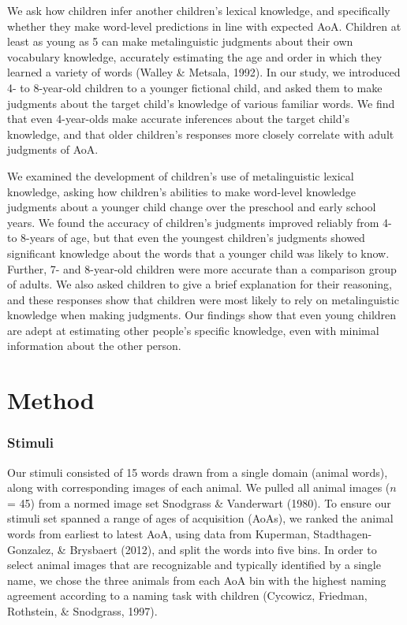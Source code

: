 \documentclass[10pt, letterpaper]{article}
\begin{document}
We ask how children infer another children's lexical knowledge, and
specifically whether they make word-level predictions in line with
expected AoA. Children at least as young as 5 can make metalinguistic
judgments about their own vocabulary knowledge, accurately estimating
the age and order in which they learned a variety of words (Walley \&
Metsala, 1992). In our study, we introduced 4- to 8-year-old children to
a younger fictional child, and asked them to make judgments about the
target child's knowledge of various familiar words. We find that even
4-year-olds make accurate inferences about the target child's knowledge,
and that older children's responses more closely correlate with adult
judgments of AoA.

We examined the development of children's use of metalinguistic lexical
knowledge, asking how children's abilities to make word-level knowledge
judgments about a younger child change over the preschool and early
school years. We found the accuracy of children's judgments improved
reliably from 4- to 8-years of age, but that even the youngest
children's judgments showed significant knowledge about the words that a
younger child was likely to know. Further, 7- and 8-year-old children
were more accurate than a comparison group of adults. We also asked
children to give a brief explanation for their reasoning, and these
responses show that children were most likely to rely on metalinguistic
knowledge when making judgments. Our findings show that even young
children are adept at estimating other people's specific knowledge, even
with minimal information about the other person.

\hypertarget{method}{%
\section{Method}\label{method}}

\hypertarget{stimuli}{%
\subsubsection{Stimuli}\label{stimuli}}

Our stimuli consisted of 15 words drawn from a single domain (animal
words), along with corresponding images of each animal. We pulled all
animal images (\(n\) = 45) from a normed image set Snodgrass \&
Vanderwart (1980). To ensure our stimuli set spanned a range of ages of
acquisition (AoAs), we ranked the animal words from earliest to latest
AoA, using data from Kuperman, Stadthagen-Gonzalez, \& Brysbaert (2012),
and split the words into five bins. In order to select animal images
that are recognizable and typically identified by a single name, we
chose the three animals from each AoA bin with the highest naming
agreement according to a naming task with children (Cycowicz, Friedman,
Rothstein, \& Snodgrass, 1997).
\end{document}
